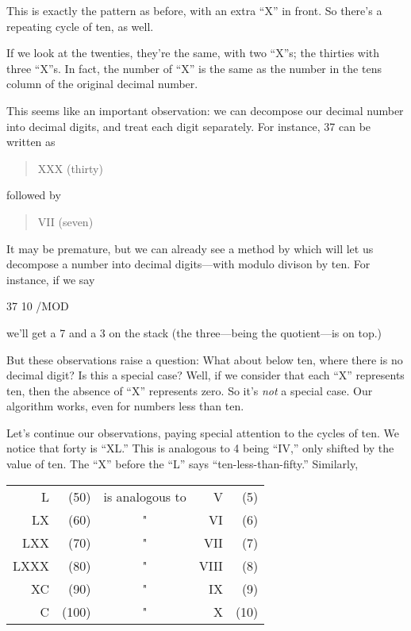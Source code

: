 \bigskip
\noindent This is exactly the pattern as before, with an extra ``X''
in front. So there's a repeating cycle of ten, as well.

If we look at the twenties, they're the same, with two ``X''s; the
thirties with three ``X''s. In fact, the number of ``X'' is the same as the
number in the tens column of the original decimal number.

This seems like an important observation: we can decompose our decimal
number into decimal digits, and treat each digit separately. For instance,
37 can be written as

\begin{quote}
{\sf XXX (thirty)}
\end{quote}

\noindent followed by

\begin{quote}
{\sf VII (seven)}
\end{quote}

\noindent It may be premature, but we can already see a method by
which \Forth{} will let us decompose a number into decimal digits---with
modulo divison by ten. For instance, if we say

\begin{Code}
37 10 /MOD
\end{Code}
we'll get a 7 and a 3 on the stack (the three---being the quotient---is on
top.)

But these observations raise a question: What about below ten,
where there is no decimal digit? Is this a special case? Well, if we consider
that each ``X'' represents ten, then the absence of ``X'' represents zero.
So it's \emph{not} a special case. Our algorithm works, even for numbers less
than ten.

Let's continue our observations, paying special attention to the
cycles of ten. We notice that forty is ``XL.'' This is analogous to 4 being
``IV,'' only shifted by the value of ten. The ``X'' before the ``L'' says
``ten-less-than-fifty.'' Similarly,

\bigskip
{\sf\begin{tabular}{rrcrr}
   L &  (50) &   is analogous to &     V & (5) \\
  LX &  (60) &          "        &    VI & (6) \\
 LXX &  (70) &          "        &   VII & (7) \\
LXXX &  (80) &          "        &  VIII & (8) \\
  XC &  (90) &          "        &    IX & (9) \\
   C & (100) &          "        &     X & (10) \\
\end{tabular}}
\bigskip

